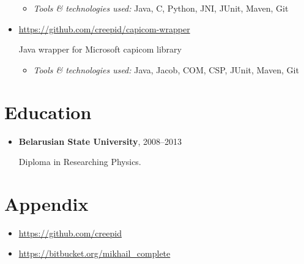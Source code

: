\documentclass[a4paper, 12pt]{article}
\newcommand{\position}[1]{
    \textbf{#1}}
\newcommand{\itemlabel}[1]{
    \textit{#1:}}
\begin{document}
\begin{itemize}
            \begin{itemize}
                \item \itemlabel{Tools \& technologies used} Java, C, Python, JNI, JUnit, Maven, Git
            \end{itemize}
            
            \item \href{https://github.com/creepid/capicom-wrapper}{https://github.com/creepid/capicom-wrapper}

           Java wrapper for Microsoft capicom library

            \begin{itemize}
                \item \itemlabel{Tools \& technologies used} Java, Jacob,  COM, CSP, JUnit, Maven, Git
            \end{itemize}
            
    \end{itemize}    

\section*{Education}

    \begin{itemize}

        \item \position{Belarusian State University}, 2008--2013

            Diploma in Researching Physics.

    \end{itemize}

\section*{Appendix}

    \begin{itemize}
        \item \href{https://github.com/creepid}{https://github.com/creepid}
    \end{itemize}
        \begin{itemize}
        \item \href{https://bitbucket.org/mikhail_complete}{https://bitbucket.org/mikhail\_complete}
    \end{itemize}
\end{document}
